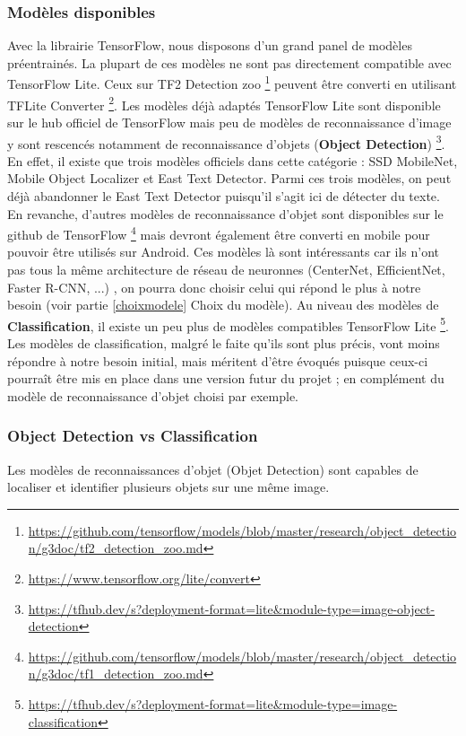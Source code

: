 \documentclass[UTF8]{EPURapport}
\begin{document}
\subsubsection{Modèles disponibles}
Avec la librairie TensorFlow, nous disposons d'un grand panel de modèles préentrainés. La plupart de ces modèles ne sont pas directement compatible avec TensorFlow Lite. Ceux sur TF2 Detection zoo \footnote{\url{https://github.com/tensorflow/models/blob/master/research/object_detection/g3doc/tf2_detection_zoo.md}} peuvent être converti en utilisant TFLite Converter \footnote{\url{https://www.tensorflow.org/lite/convert}}. Les modèles déjà adaptés TensorFlow Lite sont disponible sur le hub officiel de TensorFlow mais peu de modèles de reconnaissance d'image y sont rescencés notamment de reconnaissance d'objets (\textbf{Object Detection}) \footnote{\url{https://tfhub.dev/s?deployment-format=lite&module-type=image-object-detection}}. En effet, il existe que trois modèles officiels dans cette catégorie : SSD MobileNet, Mobile Object Localizer et East Text Detector. Parmi ces trois modèles, on peut déjà abandonner le East Text Detector puisqu'il s'agit ici de détecter du texte. En revanche, d'autres modèles de reconnaissance d'objet sont disponibles sur le github de TensorFlow \footnote{\url{https://github.com/tensorflow/models/blob/master/research/object_detection/g3doc/tf1_detection_zoo.md}} mais devront également être converti en mobile pour pouvoir être utilisés sur Android. Ces modèles là sont intéressants car ils n'ont pas tous la même architecture de réseau de neuronnes (CenterNet, EfficientNet, Faster R-CNN, ...) , on pourra donc choisir celui qui répond le plus à notre besoin (voir partie \ref{choixmodele} Choix du modèle). Au niveau des modèles de \textbf{Classification}, il existe un peu plus de modèles compatibles TensorFlow Lite \footnote{\url{https://tfhub.dev/s?deployment-format=lite&module-type=image-classification}}. Les modèles de classification, malgré le faite qu'ils sont plus précis, vont moins répondre à notre besoin initial, mais méritent d'être évoqués puisque ceux-ci pourraît être mis en place dans une version futur du projet ; en complément du modèle de reconnaissance d'objet choisi par exemple.

\subsubsection{Object Detection vs Classification}
Les modèles de reconnaissances d'objet (Objet Detection) sont capables de localiser et identifier plusieurs objets sur une même image.
\end{document}
